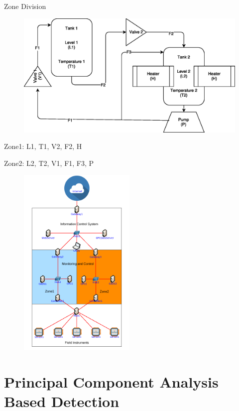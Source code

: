 \documentclass[10pt]{beamer}
\begin{document}
\begin{frame}{Zone Division}
	\begin{figure}
		\centering
		\includegraphics[width=\textwidth]{plant.eps}
	\end{figure}
    Zone1: L1, T1, V2, F2, H
    
    Zone2: L2, T2, V1, F1, F3, P
\end{frame}

\begin{frame}
	\begin{figure}
		\centering
		\includegraphics[width=0.5\textwidth]{ControlNetwork.png}
	\end{figure}
\end{frame}


\section{Principal Component Analysis Based Detection\cite{morita2013detection}}
\end{document}
